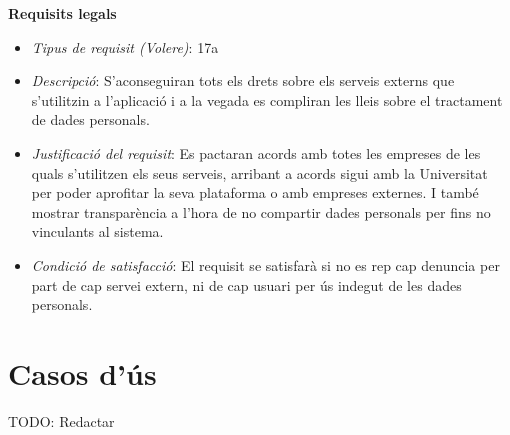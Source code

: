 \noindent\textbf{Requisits legals}
\begin{itemize}
\item \textit{Tipus de requisit (Volere)}: 17a
\item \textit{Descripció}: S'aconseguiran tots els drets sobre els serveis externs que s'utilitzin a l'aplicació i a la vegada es compliran les lleis sobre el tractament de dades personals.
\item \textit{Justificació del requisit}: Es pactaran acords amb totes les empreses de les quals s'utilitzen els seus serveis, arribant a acords sigui amb la Universitat per poder aprofitar la seva plataforma o amb empreses externes. I també mostrar transparència a l'hora de no compartir dades personals per fins no vinculants al sistema.
\item \textit{Condició de satisfacció}: El requisit se satisfarà si no es rep cap denuncia per part de cap servei extern, ni de cap usuari per ús indegut de les dades personals.
\end{itemize}



\section{Casos d'ús}

TODO: Redactar
